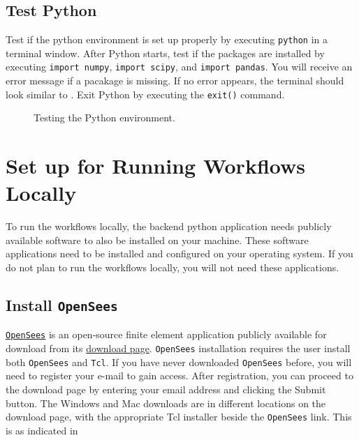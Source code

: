 \subsection{Test Python}

Test if the python environment is set up properly by
executing \texttt{python} in a terminal window. After Python starts,
test if the packages are installed by executing \texttt{import
numpy}, \texttt{import scipy}, and \texttt{import pandas}. You will
receive an error message if a pacakage is missing. If no error
appears, the terminal should look similar
to . Exit Python by executing
the \texttt{exit()} command.

\begin{figure}[!htbp]
  \caption{Testing the Python environment.}
  \label{fig:python_test}
\end{figure}

\section{Set up for Running Workflows Locally}\label{setup}

To run the workflows locally, the backend python application needs
publicly available software to also be installed on your
machine. These software applications need to be installed and
configured on your operating system. If you do not plan to run the
workflows locally, you will not need these applications.

\subsection{Install \texttt{OpenSees}}

\href{http://opensees.berkeley.edu}{\texttt{OpenSees}} is an open-source finite element application publicly available for download from its \href{http://opensees.berkeley.edu/OpenSees/user/download.php}{download page}. \texttt{OpenSees} installation requires the user install both \texttt{OpenSees} and \texttt{Tcl}.  If you have never downloaded \texttt{OpenSees} before, you will need to register your e-mail to gain access. After registration, you can proceed to the download page by entering your email address and clicking the Submit button. The Windows and Mac downloads are in different locations on the download page, with the appropriate Tcl installer beside the \texttt{OpenSees} link. This is as indicated in 

